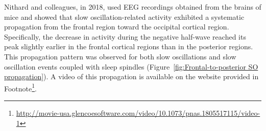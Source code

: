 \documentclass[12pt]{report}
\begin{document}
	Nithard and colleagues, in 2018\cite{Niethard2018}, used EEG recordings obtained from the brains of mice and showed that slow oscillation-related activity exhibited a systematic propagation from the frontal region toward the occipital cortical region. Specifically, the decrease in activity during the negative half-wave reached its peak slightly earlier in the frontal cortical regions than in the posterior regions. This propagation pattern was observed for both slow oscillations and slow oscillation events coupled with sleep spindles (Figure~\ref{fig:Frontal-to-posterior SO propagation}). A video of this propagation is available on the website provided in Footnote\footnote{\href{ http://movie-usa.glencoesoftware.com/video/10.1073/pnas.1805517115/video-1}{ http://movie-usa.glencoesoftware.com/video/10.1073/pnas.1805517115/video-1}}.
	
\end{document}

